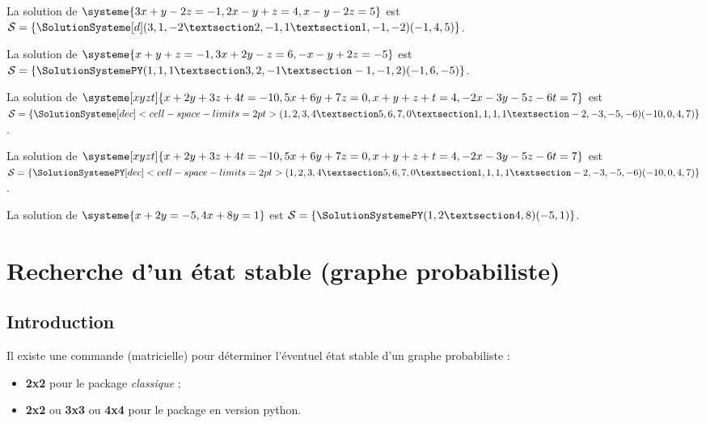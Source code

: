 \documentclass[french,a4paper,11pt]{article}
\newcommand\cmaj[1]{\tcbox[vignetteMaJ]{#1}\xspace}
\begin{document}
\begin{PresentationCode}{}
La solution de $\systeme{3x+y-2z=-1,2x-y+z=4,x-y-2z=5}$ est $\mathcal{S}=%
\left\lbrace \SolutionSysteme[d](3,1,-2 § 2,-1,1 § 1,-1,-2)(-1,4,5) \right\rbrace$.\\
\end{PresentationCode}

\begin{PresentationCode}{}
La solution de $\systeme{x+y+z=-1,3x+2y-z=6,-x-y+2z=-5}$ est $\mathcal{S}=%
\left\lbrace \SolutionSystemePY(1,1,1 § 3,2,-1 § -1,-1,2)(-1,6,-5) \right\rbrace$.
\end{PresentationCode}

\begin{PresentationCode}{}
La solution de $\systeme[xyzt]{x+2y+3z+4t=-10,5x+6y+7z=0,x+y+z+t=4,-2x-3y-5z-6t=7}$
est $\mathcal{S}=%
	\left\lbrace
		\SolutionSysteme%
		[dec]<cell-space-limits=2pt>%
		(1,2,3,4 § 5,6,7,0 § 1,1,1,1 § -2,-3,-5,-6)(-10,0,4,7)%
\right\rbrace$.
\end{PresentationCode}

\begin{PresentationCode}{}
La solution de $\systeme[xyzt]{x+2y+3z+4t=-10,5x+6y+7z=0,x+y+z+t=4,-2x-3y-5z-6t=7}$
est $\mathcal{S}=%
\left\lbrace
	\SolutionSystemePY%
		[dec]<cell-space-limits=2pt>%
		(1,2,3,4 § 5,6,7,0 § 1,1,1,1 § -2,-3,-5,-6)(-10,0,4,7)%
\right\rbrace$.
\end{PresentationCode}

\begin{PresentationCode}{}
La solution de $\systeme{x+2y=-5,4x+8y=1}$ est $\mathcal{S}=%
\left\lbrace \SolutionSystemePY(1,2 § 4,8)(-5,1) \right\rbrace$.
\end{PresentationCode}

\pagebreak

\section{Recherche d'un état stable (graphe probabiliste)}

\subsection{Introduction}

\begin{cautionblock}
\cmaj{0.1.4} Il existe une commande (matricielle) pour déterminer l'éventuel état stable d'un graphe probabiliste :

\begin{itemize}
	\item \textbf{2x2} pour le package \textit{classique} ;
	\item \textbf{2x2} ou \textbf{3x3} ou \textbf{4x4} pour le package en version \textsf{python}.
\end{itemize}
\vspace*{-\baselineskip}\leavevmode
\end{cautionblock}
\end{document}

